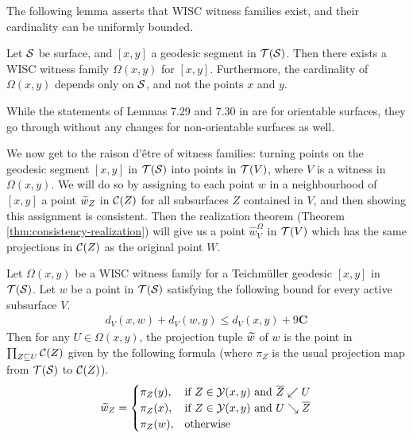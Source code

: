 \documentclass[12pt, reqno]{amsart}
\begin{document}
  The following lemma asserts that WISC witness families exist, and their cardinality can be uniformly bounded.
  \begin{lemma}
    Let $\mathcal{S}$ be surface, and $[x,y]$ a geodesic segment in $\mathcal{T}(\mathcal{S})$.
    Then there exists a WISC witness family $\Omega(x,y)$ for $[x,y]$.
    Furthermore, the cardinality of $\Omega(x,y)$ depends only on $\mathcal{S}$, and not the points $x$ and $y$.
  \end{lemma}
  \begin{rem}
    While the statements of Lemmas 7.29 and 7.30 in \textcite{dowdall2023lattice} are for orientable surfaces, they go through without any changes for non-orientable surfaces as well.
  \end{rem}

  We now get to the raison d'\^etre of witness families: turning points on the geodesic segment $[x,y]$ in $\mathcal{T}(\mathcal{S})$ into points in $\mathcal{T}(V)$, where $V$ is a witness in $\Omega(x,y)$.
  We will do so by assigning to each point $w$ in a neighbourhood of $[x,y]$ a point $\widetilde{w}_Z$ in $\mathcal{C}(Z)$ for all subsurfaces $Z$ contained in $V$, and then showing this assignment is consistent.
  Then the realization theorem (Theorem \ref{thm:consistency-realization}) will give us a point $\widehat{w}_V^{\Omega}$ in $\mathcal{T}(V)$ which has the same projections in $\mathcal{C}(Z)$ as the original point $W$.
  \begin{definition}
    \label{def:projection-tuple}
    Let $\Omega(x,y)$ be a WISC witness family for a Teichmüller geodesic $[x,y]$ in $\mathcal{T}(\mathcal{S})$.
    Let $w$ be a point in $\mathcal{T}(\mathcal{S})$ satisfying the following bound for every active subsurface $V$.
    \begin{align*}
      d_{V}(x, w) + d_{V}(w, y) \leq d_{V}(x, y) + 9 \mathbf{C}
    \end{align*}
    Then for any $U \in \Omega(x,y)$, the projection tuple $\widetilde{w}$ of $w$ is the point in $\prod_{Z \sqsubseteq U} \mathcal{C}(Z)$ given by the following formula (where $\pi_Z$ is the usual projection map from $\mathcal{T}(\mathcal{S})$ to $\mathcal{C}(Z)$).
    \begin{align*}
      \widetilde{w}_Z =
      \begin{cases}
        \pi_Z(y), & \text{if $Z \in \mathcal{Y}(x,y)$ and $\overline{Z} \swarrow U$} \\
        \pi_Z(x), & \text{if $Z \in \mathcal{Y}(x,y)$ and $U \searrow \overline{Z}$} \\
        \pi_Z(w), & \text{otherwise}
      \end{cases}
    \end{align*}
  \end{definition}
\end{document}

